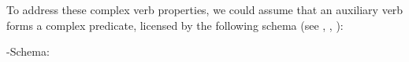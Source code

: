\documentclass[output=paper
                ,modfonts
                ,nonflat
	        ,collection
	        ,collectionchapter
	        ,collectiontoclongg
 	        ,biblatex
                ,babelshorthands
                ,newtxmath
                ,draftmode
                ,colorlinks, citecolor=brown
]{./langsci/langscibook}
\begin{document}
{\begin{exe}
\begin{xlist}
\begin{exe}
\begin{xlist}
To address these complex verb properties, we could assume that
an auxiliary verb forms a complex predicate, licensed by
the following schema (see \citet{Bratt:96}, \citet{Chung:98}, \citet{Kim:16}):


\ea
\label{negation-hd-lex-cxt}
\head-\LIGHT Schema:\\
\z


\end{xlist}
\end{exe}
\end{xlist}
\end{exe}}
\end{document}
